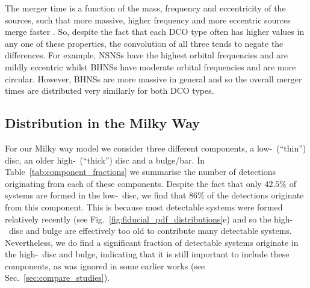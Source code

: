 The merger time is a function of the mass, frequency and eccentricity of the sources, such that more massive, higher frequency and more eccentric sources merge faster \citep[][Eq.~5.14]{Peters+1964}. So, despite the fact that each DCO type often has higher values in any one of these properties, the convolution of all three tends to negate the differences. For example, NSNSs have the highest orbital frequencies and are mildly eccentric whilst BHNSs have moderate orbital frequencies and are more circular. However, BHNSs are more massive in general and so the overall merger times are distributed very similarly for both DCO types.

\subsection{Distribution in the Milky Way}\label{sec:mw_detectable_distribution}
For our Milky way model we consider three different components, a low-\achem~(``thin'') disc, an older high-\achem~(``thick'') disc and a bulge/bar. In Table~\ref{tab:component_fractions} we summarise the number of detections originating from each of these components. Despite the fact that only $42.5\%$ of systems are formed in the low-\achem~disc, we find that $86\%$ of the detections originate from this component. This is because most detectable systems were formed relatively recently (see Fig.~\ref{fig:fiducial_pdf_distributions}e) and so the high-\achem~disc and bulge are effectively too old to contribute many detectable systems. Nevertheless, we do find a significant fraction of detectable systems originate in the high-\achem~disc and bulge, indicating that it is still important to include these components, as was ignored in some earlier works (see Sec.~\ref{sec:compare_studies}).

